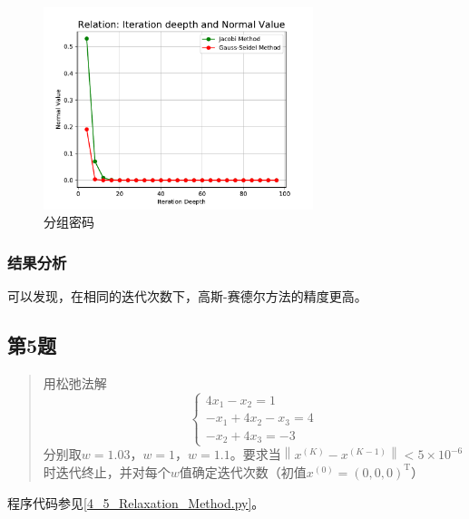 \begin{figure}[H]   %
    \centering
    \includegraphics[width=0.7\textwidth]{../../img/04/compare.pdf}
    \caption{分组密码}
    \label{Fig:分组密码}
\end{figure}

\subsubsection{结果分析}
可以发现，在相同的迭代次数下，高斯-赛德尔方法的精度更高。


\subsection{第5题}
\begin{quote}
    {\kaishu
        用松弛法解
        \begin{equation}
            \left\{\begin{array}{r}{4 x_{1}-x_{2}=1} \\ {-x_{1}+4 x_{2}-x_{3}=4} \\ {-x_{2}+4 x_{3}=-3}\end{array}\right.
        \end{equation}
    分别取$w=1.03$，$w=1$，$w=1.1$。要求当$\left\|x^{(K)}-x^{(K-1)}\right\|<5 \times 10^{-6}$时迭代终止，并对每个$w$值确定迭代次数（初值$x^{(0)}=(0,0,0)^{\mathrm{T}}$）
    }
\end{quote}

程序代码参见\ref{4_5_Relaxation_Method.py}。

